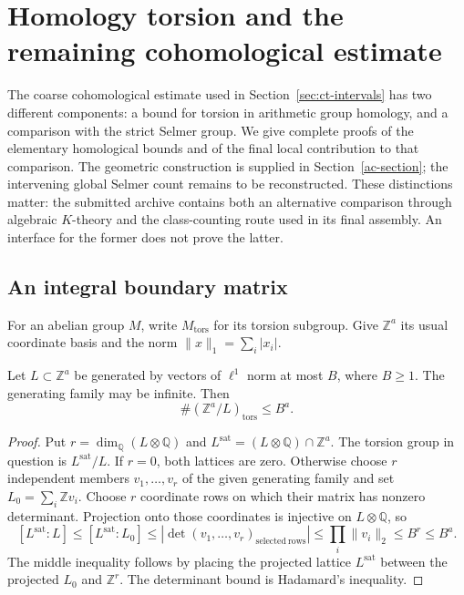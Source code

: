 \section{Homology torsion and the remaining cohomological estimate}
\label{ht-section}

The coarse cohomological estimate used in
Section~\ref{sec:ct-intervals} has two different components: a bound for
torsion in arithmetic group homology, and a comparison with the
strict Selmer group.  We give complete proofs of the elementary
homological bounds and of the final local contribution to that
comparison. The geometric construction is supplied in
Section~\ref{ac-section}; the intervening global Selmer count
remains to be reconstructed. These distinctions matter: the submitted
archive contains both an alternative comparison through algebraic
$K$-theory and the class-counting route used in its final assembly.
An interface for the former does not prove the latter.

\subsection{An integral boundary matrix}

For an abelian group $M$, write $M_{\mathrm{tors}}$ for its torsion
subgroup.  Give $\mathbb Z^a$ its usual coordinate basis and the
norm $\|x\|_1=\sum_i|x_i|$.

\begin{lemma}\label{ht-matrix}
Let $L\subset\mathbb Z^a$ be generated by vectors of $\ell^1$ norm
at most $B$, where $B\ge1$.  The generating family may be infinite.
Then
\[
             \#(\mathbb Z^a/L)_{\mathrm{tors}}\le B^a.
\]
\end{lemma}
\begin{proof}
Put $r=\dim_{\mathbb Q}(L\otimes\mathbb Q)$ and
$L^{\mathrm{sat}}=(L\otimes\mathbb Q)\cap\mathbb Z^a$.
The torsion group in question is $L^{\mathrm{sat}}/L$.
If $r=0$, both lattices are zero.  Otherwise choose $r$ independent
members $v_1,\ldots,v_r$ of the given generating family and set
$L_0=\sum_i\mathbb Zv_i$.  Choose $r$ coordinate rows on which their
matrix has nonzero determinant.  Projection onto those coordinates
is injective on $L\otimes\mathbb Q$, so
\[
 [L^{\mathrm{sat}}:L]\le[L^{\mathrm{sat}}:L_0]
 \le\left|\det(v_1,\ldots,v_r)_{\mathrm{selected\ rows}}\right|
 \le\prod_i\|v_i\|_2\le B^r\le B^a.
\]
The middle inequality follows by placing the projected lattice
$L^{\mathrm{sat}}$ between the projected $L_0$ and $\mathbb Z^r$.
The determinant bound is Hadamard's inequality.
\end{proof}

